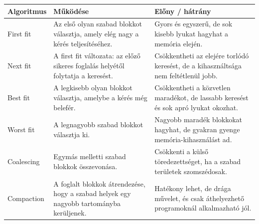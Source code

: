\begin{tabularx}{\textwidth}{L{24mm}X X}
\toprule
\textbf{Algoritmus} & \textbf{Működése} & \textbf{Előny / hátrány} \\
\midrule
First fit & Az első olyan szabad blokkot választja, amely elég nagy a kérés teljesítéséhez. & Gyors és egyszerű, de sok kisebb lyukat hagyhat a memória elején. \\
Next fit & A first fit változata: az előző sikeres foglalás helyétől folytatja a keresést. & Csökkentheti az elejére torlódó keresést, de a kihasználtsága nem feltétlenül jobb. \\
Best fit & A legkisebb olyan blokkot választja, amelybe a kérés még belefér. & Csökkentheti a közvetlen maradékot, de lassabb keresést és sok apró lyukat okozhat. \\
Worst fit & A legnagyobb szabad blokkot választja ki. & Nagyobb maradék blokkokat hagyhat, de gyakran gyenge memória-kihasználást ad. \\
Coalescing & Egymás melletti szabad blokkok összevonása. & Csökkenti a külső töredezettséget, ha a szabad területek szomszédosak. \\
Compaction & A foglalt blokkok átrendezése, hogy a szabad helyek egy nagyobb tartományba kerüljenek. & Hatékony lehet, de drága művelet, és csak áthelyezhető programoknál alkalmazható jól. \\
\bottomrule
\end{tabularx}
